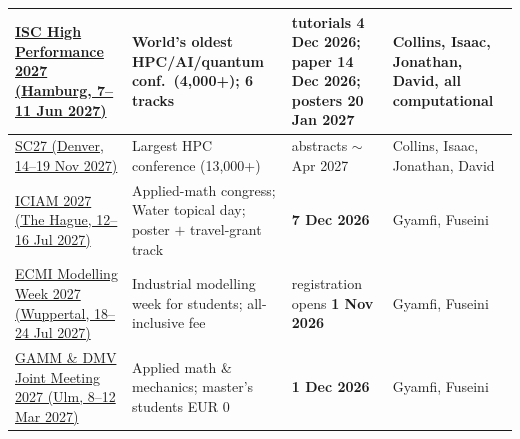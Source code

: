 \documentclass[11pt,a4paper]{article}
\begin{document}
\begin{longtable}{@{}p{3.4cm}p{5.6cm}p{2.2cm}p{2.7cm}@{}}
\midrule
\href{https://isc-hpc.com/}{ISC High Performance 2027 (Hamburg, 7--11 Jun 2027)} & World's oldest HPC/AI/quantum conf.\ (4{,}000+); 6 tracks & tutorials \textbf{4 Dec 2026}; paper \textbf{14 Dec 2026}; posters 20 Jan 2027 & Collins, Isaac, Jonathan, David, all computational \\
\midrule
\href{https://supercomputing.org/}{SC27 (Denver, 14--19 Nov 2027)} & Largest HPC conference (13{,}000+) & abstracts $\sim$Apr 2027 & Collins, Isaac, Jonathan, David \\
\midrule
\href{https://iciam2027.org/}{ICIAM 2027 (The Hague, 12--16 Jul 2027)} & Applied-math congress; Water topical day; poster $+$ travel-grant track & \textbf{7 Dec 2026} & Gyamfi, Fuseini \\
\midrule
\href{https://ecmimw.uni-wuppertal.de/en}{ECMI Modelling Week 2027 (Wuppertal, 18--24 Jul 2027)} & Industrial modelling week for students; all-inclusive fee & registration opens \textbf{1 Nov 2026} & Gyamfi, Fuseini \\
\midrule
\href{https://jahrestagung.gamm.org/joint-annual-meeting-2027/}{GAMM \& DMV Joint Meeting 2027 (Ulm, 8--12 Mar 2027)} & Applied math \& mechanics; master's students EUR 0 & \textbf{1 Dec 2026} & Gyamfi, Fuseini \\
\midrule


\end{longtable}
\end{document}
